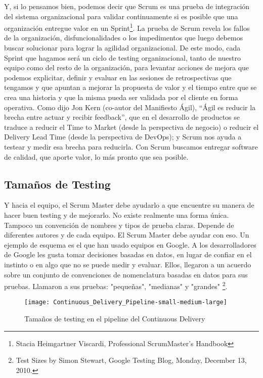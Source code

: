 Y, si lo pensamos bien, podemos decir que Scrum es una prueba de integración del sistema organizacional para validar continuamente si es posible que una organización entregue valor en un Sprint\footnote{Stacia Heimgartner Viscardi, Professional ScrumMaster's Handbook}. La prueba de Scrum revela los fallos de la organización, disfuncionalidades o los impedimentos que luego debemos buscar solucionar para lograr la agilidad organizacional. De este modo, cada Sprint que hagamos será un ciclo de testing organizacional, tanto de nuestro equipo como del resto de la organización, para levantar acciones de mejora que podemos explicitar, definir y evaluar en las sesiones de retrospectivas que tengamos y que apuntan a mejorar la propuesta de valor y el tiempo entre que se crea una historia y que la misma pueda ser validada por el cliente en forma operativa. Como dijo Jon Kern (co-autor del Manifiesto Ágil), “Ágil es reducir la brecha entre actuar y recibir feedback”, que en el desarrollo de productos se traduce a reducir el Time to Market (desde la perspectiva de negocio) o reducir el Delivery Lead Time (desde la perspectiva de DevOps); y Scrum nos ayuda a testear y medir esa brecha para reducirla. Con Scrum buscamos entregar software de calidad, que aporte valor, lo más pronto que sea posible.

\subsection{Tamaños de Testing}

Y hacia el equipo, el Scrum Master debe ayudarlo a que encuentre su manera de hacer buen testing y de mejorarlo. No existe realmente una forma única. Tampoco un convención de nombres y tipos de prueba claras. Depende de diferentes autores y de cada equipo. El Scrum Master debe ayudar con eso. Un ejemplo de esquema es el que han usado equipos en Google. A los desarrolladores de Google les gusta tomar decisiones basadas en datos, en lugar de confiar en el instinto o en algo que no se puede medir y evaluar. Ellos, llegaron a un acuerdo sobre un conjunto de convenciones de nomenclatura basadas en datos para sus pruebas. Llamaron a sus pruebas: "pequeñas", "medianas" y "grandes" \footnote{Test Sizes by Simon Stewart, Google Testing Blog, Monday, December 13, 2010.}. 

\begin{figure}[h]
  \centering
  \texttt{[image: Continuous\_Delivery\_Pipeline-small-medium-large]}
  \caption{Tamaños de testing en el pipeline del Continuous Delivery}
  \centering
  \label{fig:Continuous_Delivery_Pipeline-small-medium-large} %
\end{figure}
\FloatBarrier %


